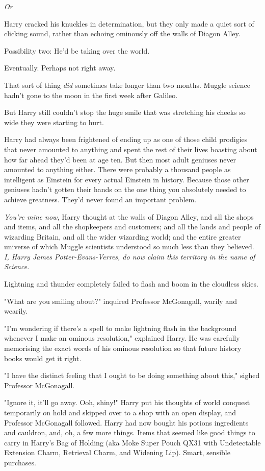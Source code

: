 \emph{Or}{\el}

Harry cracked his knuckles in determination, but they only made a quiet sort of
clicking sound, rather than echoing ominously off the walls of Diagon Alley.

Possibility two: He'd be taking over the world.

Eventually. Perhaps not right away.

That sort of thing \emph{did} sometimes take longer than two months. Muggle
science hadn't gone to the moon in the first week after Galileo.

But Harry still couldn't stop the huge smile that was stretching his cheeks so
wide they were starting to hurt.

Harry had always been frightened of ending up as one of those child prodigies
that never amounted to anything and spent the rest of their lives boasting
about how far ahead they'd been at age ten. But then most adult geniuses never
amounted to anything either. There were probably a thousand people as
intelligent as Einstein for every actual Einstein in history. Because those
other geniuses hadn't gotten their hands on the one thing you absolutely needed
to achieve greatness. They'd never found an important problem.

\emph{You're mine now,} Harry thought at the walls of Diagon Alley, and all the
shops and items, and all the shopkeepers and customers; and all the lands and
people of wizarding Britain, and all the wider wizarding world; and the entire
greater universe of which Muggle scientists understood so much less than they
believed. \emph{I, Harry James Potter-Evans-Verres, do now claim this territory
in the name of Science.}

Lightning and thunder completely failed to flash and boom in the cloudless
skies.

"What are you smiling about?" inquired Professor McGonagall, warily and wearily.

"I'm wondering if there's a spell to make lightning flash in the background
whenever I make an ominous resolution," explained Harry. He was carefully
memorising the exact words of his ominous resolution so that future history
books would get it right.

"I have the distinct feeling that I ought to be doing something about this,"
sighed Professor McGonagall.

"Ignore it, it'll go away. Ooh, shiny!" Harry put his thoughts of world
conquest temporarily on hold and skipped over to a shop with an open display,
and Professor McGonagall followed.
\sbreak
Harry had now bought his potions ingredients and cauldron, and, oh, a few more
things. Items that seemed like good things to carry in Harry's Bag of Holding
(aka Moke Super Pouch QX31 with Undetectable Extension Charm, Retrieval Charm,
and Widening Lip). Smart, sensible purchases.

